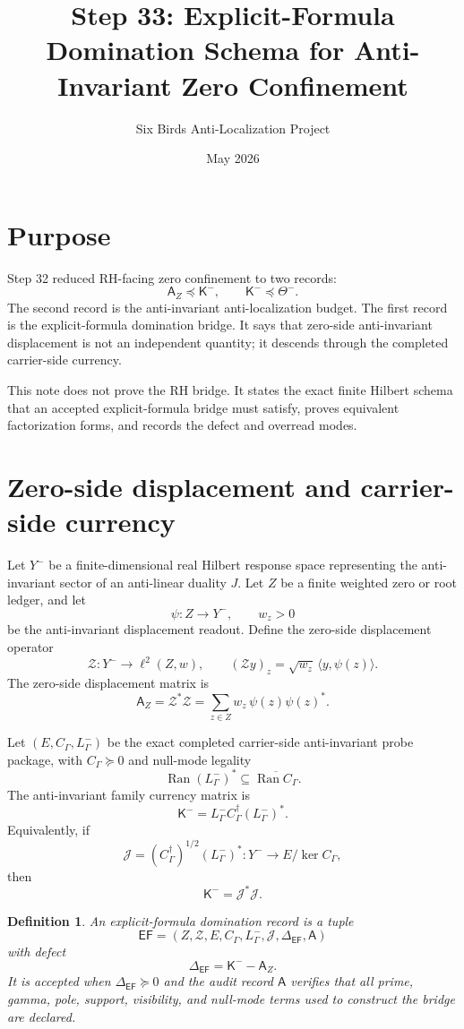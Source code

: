 \documentclass[11pt]{article}
\title{Step 33: Explicit-Formula Domination Schema for Anti-Invariant Zero Confinement}
\author{Six Birds Anti-Localization Project}
\date{May 2026}
\newtheorem{definition}[theorem]{Definition}
\DeclareMathOperator{\Ran}{Ran}
\newcommand{\Kmat}{\mathsf K}
\newcommand{\AZ}{\mathsf A_Z}
\newcommand{\EF}{\mathsf{EF}}
\begin{document}
\maketitle

\section{Purpose}
Step 32 reduced RH-facing zero confinement to two records:
\[
  \AZ \preceq \Kmat^- , \qquad \Kmat^-\preceq \Theta^- .
\]
The second record is the anti-invariant anti-localization budget.  The first record is the explicit-formula domination bridge.  It says that zero-side anti-invariant displacement is not an independent quantity; it descends through the completed carrier-side currency.

This note does not prove the RH bridge.  It states the exact finite Hilbert schema that an accepted explicit-formula bridge must satisfy, proves equivalent factorization forms, and records the defect and overread modes.

\section{Zero-side displacement and carrier-side currency}
Let $Y^-$ be a finite-dimensional real Hilbert response space representing the anti-invariant sector of an anti-linear duality $J$.  Let $Z$ be a finite weighted zero or root ledger, and let
\[
  \psi: Z\to Y^- , \qquad w_z>0
\]
be the anti-invariant displacement readout.  Define the zero-side displacement operator
\[
  \mathcal Z:Y^-\to \ell^2(Z,w),
  \qquad
  (\mathcal Z y)_z=\sqrt{w_z}\,\langle y,\psi(z)\rangle .
\]
The zero-side displacement matrix is
\[
  \AZ=\mathcal Z^*\mathcal Z
  =\sum_{z\in Z} w_z\,\psi(z)\psi(z)^* .
\]

Let $(E,C_\Gamma,L^-_\Gamma)$ be the exact completed carrier-side anti-invariant probe package, with $C_\Gamma\succeq0$ and null-mode legality
\[
  \Ran (L^-_\Gamma)^*\subseteq \overline{\Ran C_\Gamma} .
\]
The anti-invariant family currency matrix is
\[
  \Kmat^- = L^-_\Gamma C_\Gamma^\dagger (L^-_\Gamma)^*.
\]
Equivalently, if
\[
  \mathcal J = (C_\Gamma^\dagger)^{1/2}(L^-_\Gamma)^*:Y^-\to E/\ker C_\Gamma,
\]
then
\[
  \Kmat^- = \mathcal J^*\mathcal J .
\]

\begin{definition}
An explicit-formula domination record is a tuple
\[
  \EF=(Z,\mathcal Z,E,C_\Gamma,L^-_\Gamma,\mathcal J,\Delta_{\EF},\mathsf A)
\]
with defect
\[
  \Delta_{\EF}=\Kmat^- - \AZ.
\]
It is accepted when $\Delta_{\EF}\succeq0$ and the audit record $\mathsf A$ verifies that all prime, gamma, pole, support, visibility, and null-mode terms used to construct the bridge are declared.
\end{definition}
\end{document}

